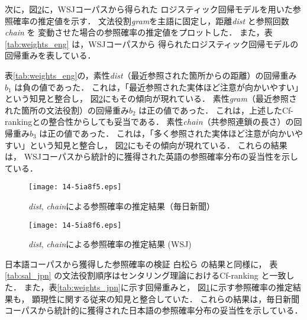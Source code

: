 \documentclass[japanese]{jnlp_1.3e}
\renewcommand{\paragraph}{}
\begin{document}
次に，図\ref{fig:dist_chain_refpr_wsj}に，WSJコーパスから得られた
ロジスティック回帰モデルを用いた参照確率の推定値を示す．
文法役割{\it gram}を主語に固定し，距離{\it dist} と参照回数{\it chain} を
変動させた場合の参照確率の推定値をプロットした．
また，表\ref{tab:weights_eng} は，WSJコーパスから
得られたロジスティック回帰モデルの回帰重みを表している．

表\ref{tab:weights_eng}の，素性{\it dist}（最近参照された箇所からの距離）の回帰重み$b_1$ は負の値であった．
これは，「最近参照された実体ほど注意が向かいやすい」という知見と整合し，
図\ref{fig:dist_chain_refpr_wsj}にもその傾向が現れている．
素性{\it gram}（最近参照された箇所の文法役割）の回帰重み$b_2$ は正の値であった．
これは，上述したCf-rankingとの整合性からしても妥当である．
素性{\it chain}（共参照連鎖の長さ）の回帰重み$b_3$ は正の値であった．
これは，「多く参照された実体ほど注意が向かいやすい」という知見と整合し，
図\ref{fig:dist_chain_refpr_wsj}にもその傾向が現れている．
これらの結果は，
WSJコーパスから統計的に獲得された英語の参照確率分布の妥当性を示している．

\begin{figure}[t]
\begin{center}
      \texttt{[image: 14-5ia8f5.eps]}
  \caption{{\it dist}, {\it chain}による参照確率の推定結果（毎日新聞）}
  \label{fig:dist_chain_refpr_mainiti}
 \end{center}
\end{figure}
\begin{figure}[t]
\begin{center}
      \texttt{[image: 14-5ia8f6.eps]}
  \caption{{\it dist}, {\it chain}による参照確率の推定結果 (WSJ)}
  \label{fig:dist_chain_refpr_wsj}
 \end{center}
\end{figure}




\paragraph{日本語コーパスから獲得した参照確率の検証}
白松ら\citeyear{siramatu2005nlp} の結果と同様に，
表\ref{tab:sal_jpn} の文法役割順序はセンタリング理論におけるCf-ranking と一致した．
また，表\ref{tab:weights_jpn}に示す回帰重みと，
図\ref{fig:dist_chain_refpr_mainiti}に示す参照確率の推定結果も，
顕現性に関する従来の知見と整合していた．
これらの結果は，毎日新聞コーパスから統計的に獲得された日本語の参照確率分布の妥当性を示している．
\end{document}
